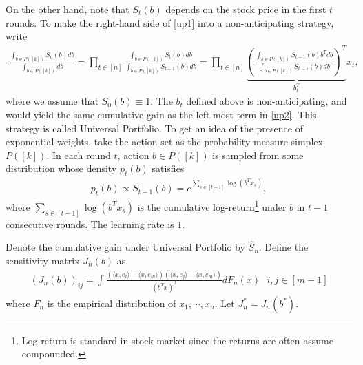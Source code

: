 \documentclass[letterpaper,10pt,openright,openany]{book}
\numberwithin{equation}{section}
\theoremstyle{plain}
\theoremstyle{definition}
\begin{document}
On the other hand, note that $S_t(b)$ depends on the stock price in the first $t$ rounds. To make the right-hand side of \eqref{up1} into a non-anticipating strategy, write
\begin{align}
\frac{\int_{b\in P([k])}S_n(b)db}{\int_{b\in P([k])}db}=\prod_{t\in [n]}\frac{\int_{b\in P([k])}S_t(b)db}{\int_{b\in P([k])}S_{t-1}(b)db}=\prod_{t\in [n]}\underbrace{\left(\frac{\int_{b\in P([k])}S_{t-1}(b)b^Tdb}{\int_{b\in P([k])}S_{t-1}(b)db}\right)^T}_{b^T_t}x_t, \label{up2}
\end{align}
where we assume that $S_0(b)\equiv 1$. The $b_t$ defined above is non-anticipating, and would yield the same cumulative gain as the left-most term in \eqref{up2}. This strategy is called Universal Portfolio. To get an idea of the presence of exponential weights, take the action set as the probability measure simplex $P([k])$. In each round $t$, action $b\in P([k])$ is sampled from some distribution whose density $p_t(b)$ satisfies
\begin{align*}
p_t(b)\propto S_{t-1}(b) = e^{\sum_{s\in [t-1]}\log(b^Tx_s)},
\end{align*} 
where $\sum_{s\in [t-1]}\log(b^Tx_s)$ is the cumulative log-return\footnote{Log-return is standard in stock market since the returns are often assume compounded. } under $b$ in $t-1$ consecutive rounds. The learning rate is $1$. 

Denote the cumulative gain under Universal Portfolio by $\hat{S}_n$. 
Define the sensitivity matrix $J_n(b)$ as
\begin{align*}
(J_n(b))_{ij} = \int\frac{(\langle x, e_i\rangle-\langle x, e_m\rangle)(\langle x, e_j\rangle-\langle x, e_m\rangle)}{(b^Tx)^2}dF_n(x)\ \ \ i,j\in [m-1]
\end{align*}
where $F_n$ is the empirical distribution of $x_1, \cdots, x_n$. Let $J_n^* = J_n(b^*)$. 
\end{document}
